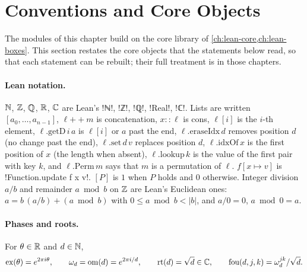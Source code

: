 \section{Conventions and Core Objects}\label{sec:lean-sym-core}

The modules of this chapter build on the core library of \cref{ch:lean-core,ch:lean-boxes}. This section restates the core objects that the statements below read, so that each statement can be rebuilt; their full treatment is in those chapters.

\paragraph{Lean notation.} $\mathbb{N}$, $\mathbb{Z}$, $\mathbb{Q}$, $\mathbb{R}$, $\mathbb{C}$ are Lean's \lean!ℕ!, \lean!ℤ!, \lean!ℚ!, \lean!Real!, \lean!ℂ!. Lists are written $[a_0,\dots,a_{n-1}]$, $\ell\mathbin{+\!\!+}m$ is concatenation, $x\mathbin{::}\ell$ is cons, $\ell[i]$ is the $i$-th element, $\ell.\mathrm{getD}\,i\,a$ is $\ell[i]$ or $a$ past the end, $\ell.\mathrm{eraseIdx}\,d$ removes position $d$ (no change past the end), $\ell.\mathrm{set}\,d\,v$ replaces position $d$, $\ell.\mathrm{idxOf}\,x$ is the first position of $x$ (the length when absent), $\ell.\mathrm{lookup}\,k$ is the value of the first pair with key $k$, and $\ell.\mathrm{Perm}\,m$ says that $m$ is a permutation of $\ell$. $f[x\mapsto v]$ is \lean!Function.update f x v!. $[P]$ is $1$ when $P$ holds and $0$ otherwise. Integer division $a/b$ and remainder $a\bmod b$ on $\mathbb{Z}$ are Lean's Euclidean ones: $a=b\,(a/b)+(a\bmod b)$ with $0\le a\bmod b<|b|$, and $a/0=0$, $a\bmod 0=a$.

\paragraph{Phases and roots.} For $\theta\in\mathbb{R}$ and $d\in\mathbb{N}$,
\[
\mathrm{ex}(\theta)=e^{2\pi i\theta},\qquad \omega_d=\mathrm{om}(d)=e^{2\pi i/d},\qquad \mathrm{rt}(d)=\sqrt{d}\in\mathbb{C},\qquad \mathrm{fou}(d,j,k)=\omega_d^{jk}/\sqrt d .
\]

